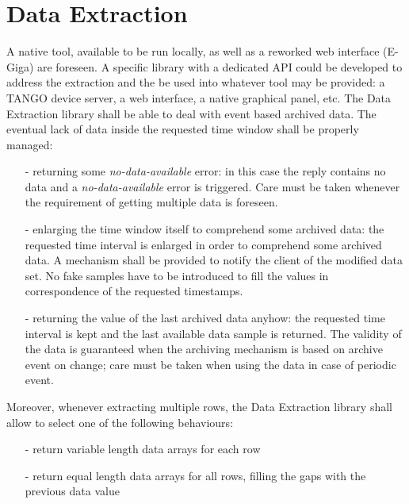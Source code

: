 \documentclass[11pt,a4paper]{article}
\def \de{Data Extraction}
\def \tango{TANGO}
\begin{document}
\section{\de}
\label{de}
A native tool, available to be run locally, as well as a reworked
web interface (E-Giga) are foreseen. A specific library with a
dedicated API could be developed to address the extraction
and the be used into whatever tool may be provided: a \tango{} device
server, a web interface, a native graphical panel, etc.
The \de{} library shall be able to deal with event based
archived data. The eventual lack of data inside the requested
time window shall be properly managed:
\begin{itemize}
	\item[-] returning some \emph{no-data-available} error: in this
					 case the reply contains no data and a \emph{no-data-available}
					 error is triggered. Care must be taken whenever the requirement
					 of getting multiple data is foreseen.
	\item[-] enlarging the time window itself to comprehend some
					 archived data: the requested time interval is enlarged in
					 order to comprehend some archived data. A mechanism shall
					 be provided to notify the client of the modified data set.
					 No fake samples have to be introduced to fill the values
					 in correspondence of the requested timestamps.
	\item[-] returning the value of the last archived data anyhow: the
					 requested time interval is kept and the last available data
					 sample is returned. The validity of the data is guaranteed
					 when the archiving mechanism is based on archive event on
					 change; care must be taken when using the data in case
					 of periodic event.
\end{itemize}
Moreover, whenever extracting multiple rows, the \de{} library
shall allow to select one of the following behaviours:
\begin{itemize}
	\item[-] return variable length data arrays for each row
	\item[-] return equal length data arrays for all rows, filling the
					 gaps with the previous data value
\end{itemize}
\end{document}
